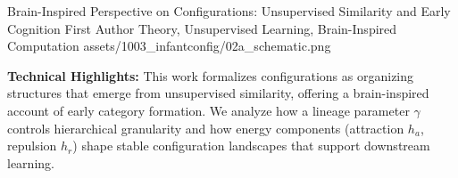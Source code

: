 \ProjectEntry
{Brain-Inspired Perspective on Configurations: Unsupervised Similarity and Early Cognition}
{First Author}
{Theory, Unsupervised Learning, Brain-Inspired Computation}
{
}
{assets/1003_infantconfig/02a_schematic.png}
{}
{ }

\textbf{Technical Highlights:}
This work formalizes configurations as organizing structures that emerge from unsupervised similarity, offering a brain-inspired account of early category formation. We analyze how a lineage parameter \(\gamma\) controls hierarchical granularity and how energy components (attraction \(h_a\), repulsion \(h_r\)) shape stable configuration landscapes that support downstream learning.


